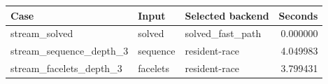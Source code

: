 {\small
\begin{tabular}{lllr}
\hline
Case & Input & Selected backend & Seconds \\
\hline
stream\_solved & solved & solved\_fast\_path & 0.000000 \\
stream\_sequence\_depth\_3 & sequence & resident-race & 4.049983 \\
stream\_facelets\_depth\_3 & facelets & resident-race & 3.799431 \\
\hline
\end{tabular}
}
